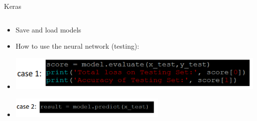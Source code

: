 \documentclass[aspectratio=169,14pt,usenames,dvipsnames]{beamer}
\begin{document}
\begin{frame}{Keras}
          \begin{columns}
                \begin{column}{0.6\textwidth}
			\begin{itemize}
				\item<1-> Save and load models 
				\item<2-> How to use the neural network (testing):
				\item<3-> \includegraphics[width=1.0\textwidth, height=0.1\textheight]{Keras_Images/Ker_10.png}
				\item<4-> \includegraphics[width=0.6\textwidth, height=0.1\textheight]{Keras_Images/Ker_11.png}
			\end{itemize}
                        

\end{column}
\end{columns}
\end{frame}
\end{document}
